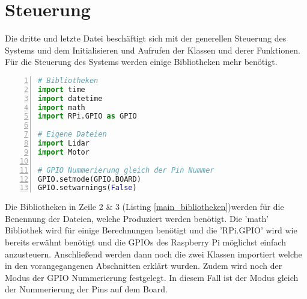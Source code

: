 \section{Steuerung}
Die dritte und letzte Datei beschäftigt sich mit der generellen Steuerung des Systems und dem Initialisieren und Aufrufen der Klassen und derer Funktionen.\\
Für die Steuerung des Systems werden einige Bibliotheken mehr benötigt.
\begin{lstlisting}[caption={Bibliotheken zur Steuerung des Systems}, language={Python}, label={main_bibliotheken}, numbers=left]
# Bibliotheken
import time
import datetime
import math
import RPi.GPIO as GPIO

# Eigene Dateien
import Lidar
import Motor

# GPIO Nummerierung gleich der Pin Nummer
GPIO.setmode(GPIO.BOARD)
GPIO.setwarnings(False)
\end{lstlisting}
Die Bibliotheken in Zeile 2 \& 3 (Listing \ref{main_bibliotheken})werden für die Benennung der Dateien, welche Produziert werden benötigt. Die 'math' Bibliothek wird für einige Berechnungen benötigt und die 'RPi.GPIO' wird wie bereits erwähnt benötigt und die \acp{GPIO} des Raspberry Pi möglichst einfach anzusteuern. Anschließend werden dann noch die zwei Klassen importiert welche in den vorangegangenen Abschnitten erklärt wurden. Zudem wird noch der Modus der \ac{GPIO} Nummerierung festgelegt. In diesem Fall ist der Modus gleich der Nummerierung der Pins auf dem Board. \\
